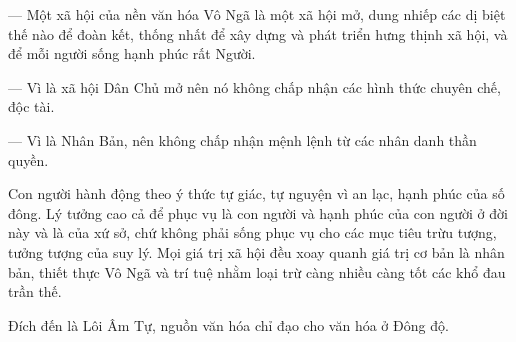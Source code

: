 --- Một xã hội của nền văn hóa Vô Ngã là một xã hội mở, dung nhiếp các dị biệt thế nào để đoàn kết, thống nhất để xây dựng và phát triển hưng thịnh xã hội, và để mỗi người sống hạnh phúc rất Người.

--- Vì là xã hội Dân Chủ mở nên nó không chấp nhận các hình thức chuyên chế, độc tài.

--- Vì là Nhân Bản, nên không chấp nhận mệnh lệnh từ các nhân danh thần quyền.

Con người hành động theo ý thức tự giác, tự nguyện vì an lạc, hạnh phúc của số đông. Lý tưởng cao cả để phục vụ là con người và hạnh phúc của con người ở đời này và là của xứ sở, chứ không phải sống phục vụ cho các mục tiêu trừu tượng, tưởng tượng của suy lý. Mọi giá trị xã hội đều xoay quanh giá trị cơ bản là nhân bản, thiết thực Vô Ngã và trí tuệ nhằm loại trừ càng nhiều càng tốt các khổ đau trần thế.

Đích đến là Lôi Âm Tự, nguồn văn hóa chỉ đạo cho văn hóa ở Đông độ.

